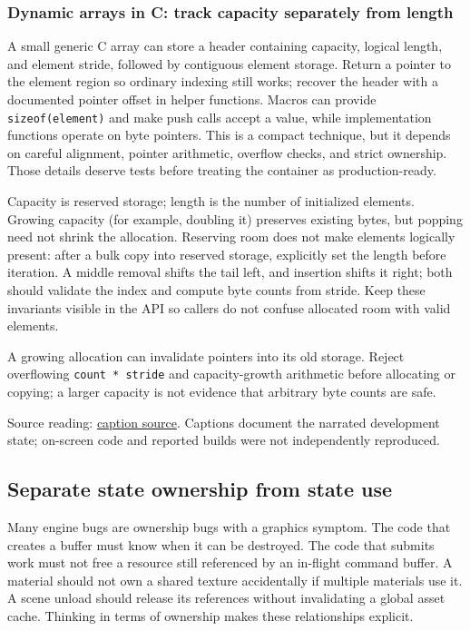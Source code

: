 \subsubsection{Dynamic arrays in C: track capacity separately from length}\label{05-engine-i-ch014-dynamic-arrays-in-c-track-capacity-separately-from-length}

A small generic C array can store a header containing capacity, logical length, and element stride, followed by contiguous element storage. Return a pointer to the element region so ordinary indexing still works; recover the header with a documented pointer offset in helper functions. Macros can provide \texttt{sizeof(element)} and make push calls accept a value, while implementation functions operate on byte pointers. This is a compact technique, but it depends on careful alignment, pointer arithmetic, overflow checks, and strict ownership. Those details deserve tests before treating the container as production-ready.

Capacity is reserved storage; length is the number of initialized elements. Growing capacity (for example, doubling it) preserves existing bytes, but popping need not shrink the allocation. Reserving room does not make elements logically present: after a bulk copy into reserved storage, explicitly set the length before iteration. A middle removal shifts the tail left, and insertion shifts it right; both should validate the index and compute byte counts from stride. Keep these invariants visible in the API so callers do not confuse allocated room with valid elements.

A growing allocation can invalidate pointers into its old storage. Reject overflowing \texttt{count\ *\ stride} and capacity-growth arithmetic before allocating or copying; a larger capacity is not evidence that arbitrary byte counts are safe.

Source reading: \href{https://www.youtube.com/watch?v=XQ6qljkh2KI}{caption source}. Captions document the narrated development state; on-screen code and reported builds were not independently reproduced.

\subsection{Separate state ownership from state use}\label{05-engine-i-ch014-separate-state-ownership-from-state-use}

Many engine bugs are ownership bugs with a graphics symptom. The code that creates a buffer must know when it can be destroyed. The code that submits work must not free a resource still referenced by an in-flight command buffer. A material should not own a shared texture accidentally if multiple materials use it. A scene unload should release its references without invalidating a global asset cache. Thinking in terms of ownership makes these relationships explicit.


